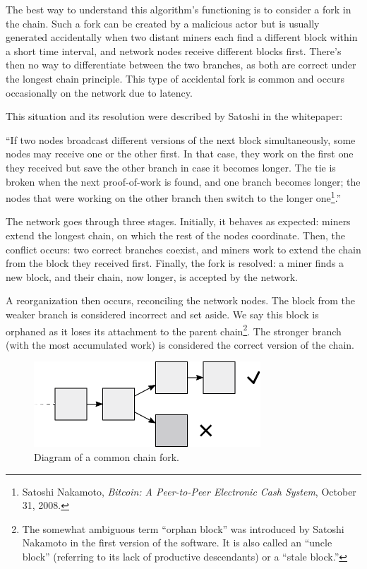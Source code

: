 \documentclass[
  a5paper,
  smalldemyvopaper,10pt,twoside,onecolumn,openright,extrafontsizes,hidelinks]{memoir}
\begin{document}
The best way to understand this algorithm's functioning is to consider a
fork in the chain. Such a fork can be created by a malicious actor but
is usually generated accidentally when two distant miners each find a
different block within a short time interval, and network nodes receive
different blocks first. There's then no way to differentiate between the
two branches, as both are correct under the longest chain principle.
This type of accidental fork is common and occurs occasionally on the
network due to latency.

This situation and its resolution were described by Satoshi in the
whitepaper:

``If two nodes broadcast different versions of the next block
simultaneously, some nodes may receive one or the other first. In that
case, they work on the first one they received but save the other branch
in case it becomes longer. The tie is broken when the next proof-of-work
is found, and one branch becomes longer; the nodes that were working on
the other branch then switch to the longer one\footnote{Satoshi
  Nakamoto, \emph{Bitcoin: A Peer-to-Peer Electronic Cash System},
  October 31, 2008.}.''

The network goes through three stages. Initially, it behaves as
expected: miners extend the longest chain, on which the rest of the
nodes coordinate. Then, the conflict occurs: two correct branches
coexist, and miners work to extend the chain from the block they
received first. Finally, the fork is resolved: a miner finds a new
block, and their chain, now longer, is accepted by the network.

A reorganization then occurs, reconciling the network nodes. The block
from the weaker branch is considered incorrect and set aside. We say
this block is orphaned as it loses its attachment to the parent
chain\footnote{The somewhat ambiguous term ``orphan block'' was
  introduced by Satoshi Nakamoto in the first version of the software.
  It is also called an ``uncle block'' (referring to its lack of
  productive descendants) or a ``stale block.''}. The stronger branch
(with the most accumulated work) is considered the correct version of
the chain.

\begin{figure}

{\centering \includegraphics{chapters/img/blockchain-common-fork.png}

}

\caption{Diagram of a common chain fork.}

\end{figure}%
\end{document}
